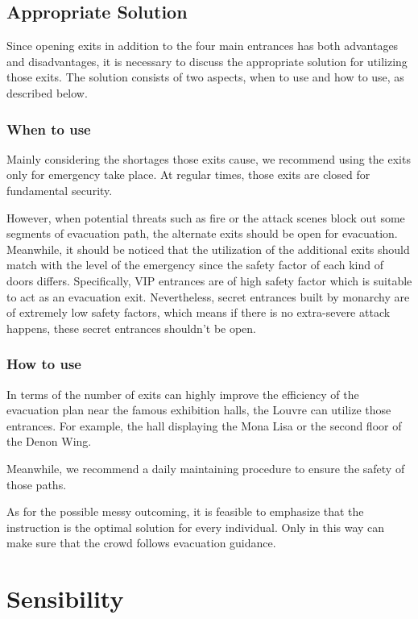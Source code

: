 \documentclass{mcmthesis}
\begin{document}
	\subsection{Appropriate Solution}
	
	Since opening exits in addition to the four main entrances has both advantages and disadvantages, it is necessary to discuss the appropriate solution for utilizing those exits. The solution consists of two aspects, when to use and how to use, as described below.
	
	\subsubsection{When to use}
	
	Mainly considering the shortages those exits cause, we recommend using the exits only for emergency take place. At regular times, those exits are closed for fundamental security.
	
	However, when potential threats such as fire or the attack scenes block out some segments of evacuation path, the alternate exits should be open for evacuation. Meanwhile, it should be noticed that the utilization of the additional exits should match with the level of the emergency since the safety factor of each kind of doors differs. Specifically, VIP entrances are of high safety factor which is suitable to act as an evacuation exit. Nevertheless, secret entrances built by monarchy are of extremely low safety factors, which means if there is no extra-severe attack happens, these secret entrances shouldn't be open.
	
	\subsubsection{How to use}
	
	In terms of the number of exits can highly improve the efficiency of the evacuation plan near the famous exhibition halls, the Louvre can utilize those entrances. For example, the hall displaying the Mona Lisa or the second floor of the Denon Wing.
	
	Meanwhile, we recommend a daily maintaining procedure to ensure the safety of those paths.
	
	As for the possible messy outcoming, it is feasible to emphasize that the instruction is the optimal solution for every individual. Only in this way can make sure that the crowd follows evacuation guidance.
	
	\section{Sensibility}
	
\end{document}
